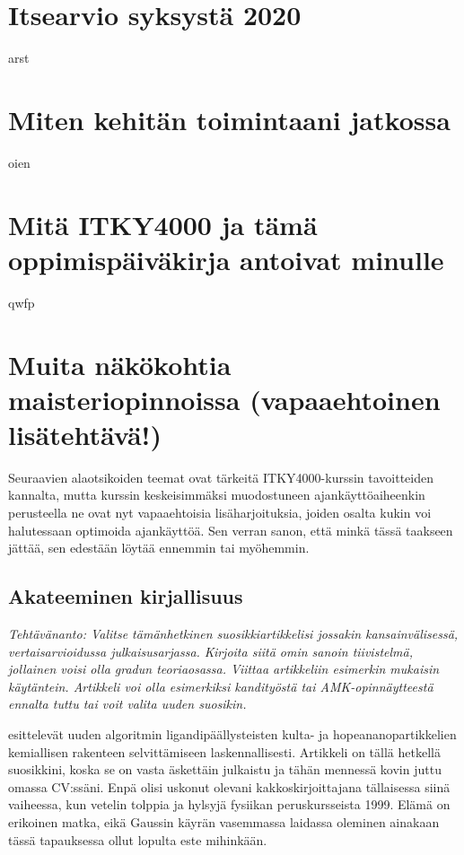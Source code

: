 \documentclass[utf8]{gradu3}
\begin{document}
\section{Itsearvio syksystä 2020}

arst

\section{Miten kehitän toimintaani jatkossa}

oien

\section{Mitä ITKY4000 ja tämä oppimispäiväkirja antoivat minulle}

qwfp

\section{Muita näkökohtia maisteriopinnoissa (vapaaehtoinen lisätehtävä!)}
\label{vapaaehtoinenLisatehtava}

Seuraavien alaotsikoiden teemat ovat tärkeitä ITKY4000-kurssin
tavoitteiden kannalta, mutta kurssin keskeisimmäksi muodostuneen
ajankäyttöaiheenkin perusteella ne ovat nyt vapaaehtoisia
lisäharjoituksia, joiden osalta kukin voi halutessaan optimoida
ajankäyttöä. Sen verran sanon, että minkä tässä taakseen jättää, sen
edestään löytää ennemmin tai myöhemmin.

\subsection{Akateeminen kirjallisuus}

\textit{Tehtävänanto: Valitse tämänhetkinen suosikkiartikkelisi
  jossakin kansainvälisessä, vertaisarvioidussa
  julkaisusarjassa. Kirjoita siitä omin sanoin tiivistelmä, jollainen
  voisi olla gradun teoriaosassa. Viittaa artikkeliin esimerkin
  mukaisin käytäntein. Artikkeli voi olla esimerkiksi kandityöstä tai
  AMK-opinnäytteestä ennalta tuttu tai voit valita uuden suosikin.}

\textcite{MalolaYm2019nano} esittelevät uuden algoritmin
ligandipäällysteisten kulta- ja hopeananopartikkelien kemiallisen
rakenteen selvittämiseen laskennallisesti. Artikkeli on tällä hetkellä
suosikkini, koska se on vasta äskettäin julkaistu ja tähän mennessä
kovin juttu omassa CV:ssäni.
%
Enpä olisi uskonut olevani kakkoskirjoittajana tällaisessa siinä
vaiheessa, kun vetelin tolppia ja hylsyjä fysiikan peruskursseista
1999. Elämä on erikoinen matka, eikä Gaussin käyrän vasemmassa
laidassa oleminen ainakaan tässä tapauksessa ollut lopulta este
mihinkään.
\end{document}
